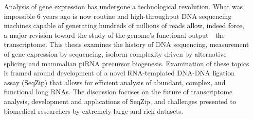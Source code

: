 \label{hd:abstract}
\abstract{}

Analysis of gene expression has undergone a technological revolution. What was impossible 6 years ago is now routine and high-throughput DNA sequencing machines capable of generating hundreds of millions of reads allow, indeed force, a major revision toward the study of the genome's functional output---the transcriptome. This thesis examines the history of DNA sequencing, measurement of gene expression by sequencing, isoform complexity driven by alternative splicing and mammalian piRNA precursor biogenesis. Examination of these topics is framed around development of a novel RNA-templated DNA-DNA ligation assay (SeqZip) that allows for efficient analysis of abundant, complex, and functional long RNAs. The discussion focuses on the future of transcriptome analysis, development and applications of SeqZip, and challenges presented to biomedical researchers by extremely large and rich datasets.

\setcounter{page}{3}
\clearpage %